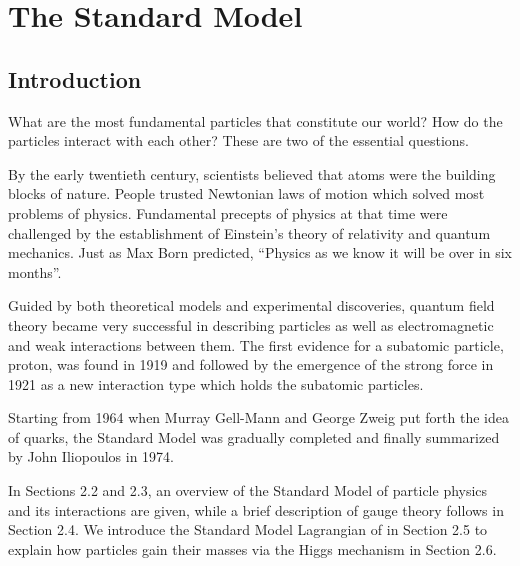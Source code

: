 \chapter{The Standard Model}

\label{ch:sm}

\section{Introduction}
\par What are the most fundamental particles that constitute our world? How do the particles interact with each other?
These are two of the essential questions.

\par By the early twentieth century, scientists believed that atoms were the building blocks of nature. People trusted Newtonian laws of motion which solved most problems of physics.
Fundamental precepts of physics at that time were challenged by the establishment of Einstein's theory of relativity and quantum mechanics.
Just as Max Born predicted, ``Physics as we know it will be over in six months''.

\par Guided by both theoretical models and experimental discoveries, quantum field theory became very successful in describing particles as well as 
electromagnetic and weak interactions between them. The first evidence for a subatomic particle, proton, was found in 1919 and followed by the emergence of the strong force in 1921 as a new interaction type which holds the subatomic particles. 

\par Starting from 1964 when Murray Gell-Mann and George Zweig put forth the idea of quarks, 
the Standard Model was gradually completed and finally summarized by John Iliopoulos in 1974.

\par In Sections 2.2 and 2.3, an overview of the Standard Model of particle physics and its interactions are given, while
a brief description of gauge theory follows in Section 2.4. We introduce the Standard Model Lagrangian of in Section 2.5 to explain 
how particles gain their masses via the Higgs mechanism in Section 2.6.

